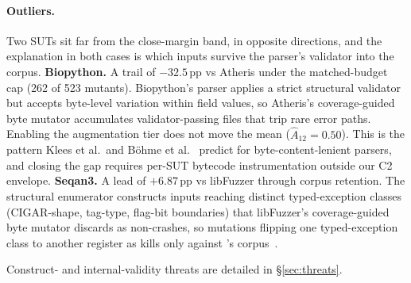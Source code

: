 \paragraph{Outliers.}
Two SUTs sit far from the close-margin band, in opposite
directions, and the explanation in both cases is which inputs
survive the parser's validator into the corpus.
\textbf{Biopython.} A trail of $-32.5$\,pp vs Atheris under the
matched-budget cap (262 of 523 mutants). Biopython's parser
applies a strict structural validator but accepts byte-level
variation within field values, so Atheris's coverage-guided
byte mutator accumulates validator-passing files that trip rare
error paths. Enabling the augmentation tier does not move the
mean ($\hat{A}_{12}{=}0.50$). This is the pattern Klees et al.\
and B\"ohme et al.~\cite{klees2018fuzz,boehme2020boosting}
predict for byte-content-lenient parsers, and closing the gap
requires per-SUT bytecode instrumentation outside our C2
envelope.
\textbf{Seqan3.} A lead of $+6.87$\,pp vs libFuzzer through
corpus retention. The structural enumerator constructs inputs
reaching distinct typed-exception classes (CIGAR-shape,
tag-type, flag-bit boundaries) that libFuzzer's coverage-guided
byte mutator discards as non-crashes, so mutations flipping one
typed-exception class to another register as kills only against
\biotest{}'s corpus~\citep{barr2015oracle}.

Construct- and internal-validity threats are detailed in
\S\ref{sec:threats}.
